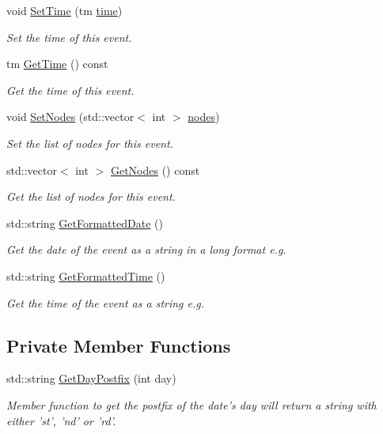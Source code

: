 \begin{DoxyCompactItemize}
void \hyperlink{classEvent_a693cefccd31003ade280a7e737f8be6c}{\-Set\-Time} (tm \hyperlink{classEvent_a91d5938dce4b4328e35f5626c22ec844}{time})
\begin{DoxyCompactList}\small\item\em \-Set the time of this event. \end{DoxyCompactList}\item 
tm \hyperlink{classEvent_aad5efdddefaa7de4196d1f22fce2c51e}{\-Get\-Time} () const 
\begin{DoxyCompactList}\small\item\em \-Get the time of this event. \end{DoxyCompactList}\item 
void \hyperlink{classEvent_a8f68ec5701be042f63a4f277af171adc}{\-Set\-Nodes} (std\-::vector$<$ int $>$ \hyperlink{classEvent_a2b330c8081c3c907a02daa7da8043fc6}{nodes})
\begin{DoxyCompactList}\small\item\em \-Set the list of nodes for this event. \end{DoxyCompactList}\item 
std\-::vector$<$ int $>$ \hyperlink{classEvent_ae3b200210aa9e4f20db5221d13d4746e}{\-Get\-Nodes} () const 
\begin{DoxyCompactList}\small\item\em \-Get the list of nodes for this event. \end{DoxyCompactList}\item 
std\-::string \hyperlink{classEvent_a2d58ebfaaa44c0da19486b7b88638b38}{\-Get\-Formatted\-Date} ()
\begin{DoxyCompactList}\small\item\em \-Get the date of the event as a string in a long format e.\-g. \end{DoxyCompactList}\item 
std\-::string \hyperlink{classEvent_a11b473724eb1d32ab67bbeaf7609b27b}{\-Get\-Formatted\-Time} ()
\begin{DoxyCompactList}\small\item\em \-Get the time of the event as a string e.\-g. \end{DoxyCompactList}\end{DoxyCompactItemize}
\subsection*{\-Private \-Member \-Functions}
\begin{DoxyCompactItemize}
\item 
std\-::string \hyperlink{classEvent_a17a23abf260b64d271aa214d08b36073}{\-Get\-Day\-Postfix} (int day)
\begin{DoxyCompactList}\small\item\em \-Member function to get the postfix of the date's day will return a string with either 'st', 'nd' or 'rd'. \end{DoxyCompactList}\end{DoxyCompactItemize}
